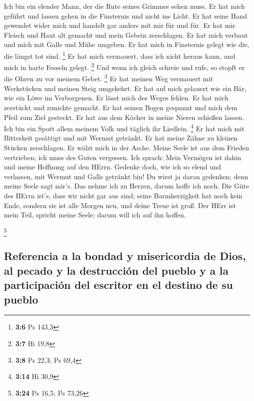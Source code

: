  Ich bin ein elender Mann, der die Rute seines Grimmes
sehen muss.  Er hat mich geführt und lassen gehen in die
Finsternis und nicht ins Licht.  Er hat seine Hand
gewendet wider mich und handelt gar anders mit mir für und für.
 Er hat mir Fleisch und Haut alt gemacht und mein Gebein
zerschlagen.  Er hat mich verbaut und mich mit Galle und
Mühe umgeben.  Er hat mich in Finsternis gelegt wie die,
die längst tot sind. \footnote{\textbf{3:6} Ps 143,3}  Er
hat mich vermauert, dass ich nicht heraus kann, und mich in harte
Fesseln gelegt. \footnote{\textbf{3:7} Hi 19,8}  Und wenn
ich gleich schreie und rufe, so stopft er die Ohren zu vor meinem Gebet.
\footnote{\textbf{3:8} Ps 22,3; Ps 69,4}  Er hat meinen
Weg vermauert mit Werkstücken und meinen Steig umgekehrt.
 Er hat auf mich gelauert wie ein Bär, wie ein Löwe im
Verborgenen.  Er lässt mich des Weges fehlen. Er hat mich
zerstückt und zunichte gemacht.  Er hat seinen Bogen
gespannt und mich dem Pfeil zum Ziel gesteckt.  Er hat
aus dem Köcher in meine Nieren schießen lassen.  Ich bin
ein Spott allem meinem Volk und täglich ihr Liedlein. \footnote{\textbf{3:14}
  Hi 30,9}  Er hat mich mit Bitterkeit gesättigt und mit
Wermut getränkt.  Er hat meine Zähne zu kleinen Stücken
zerschlagen. Er wälzt mich in der Asche.  Meine Seele ist
aus dem Frieden vertrieben; ich muss des Guten vergessen.
 Ich sprach: Mein Vermögen ist dahin und meine Hoffnung
auf den HErrn.  Gedenke doch, wie ich so elend und
verlassen, mit Wermut und Galle getränkt bin!  Du wirst
ja daran gedenken; denn meine Seele sagt mir's.  Das
nehme ich zu Herzen, darum hoffe ich noch.  Die Güte des
HErrn ist's, dass wir nicht gar aus sind; seine Barmherzigkeit hat noch
kein Ende,  sondern sie ist alle Morgen neu, und deine
Treue ist groß.  Der HErr ist mein Teil, spricht meine
Seele; darum will ich auf ihn hoffen.

\footnote{\textbf{3:24} Ps 16,5; Ps 73,26}

\hypertarget{referencia-a-la-bondad-y-misericordia-de-dios-al-pecado-y-la-destrucciuxf3n-del-pueblo-y-a-la-participaciuxf3n-del-escritor-en-el-destino-de-su-pueblo}{%
\subsection{Referencia a la bondad y misericordia de Dios, al pecado y
la destrucción del pueblo y a la participación del escritor en el
destino de su
pueblo}\label{referencia-a-la-bondad-y-misericordia-de-dios-al-pecado-y-la-destrucciuxf3n-del-pueblo-y-a-la-participaciuxf3n-del-escritor-en-el-destino-de-su-pueblo}}

